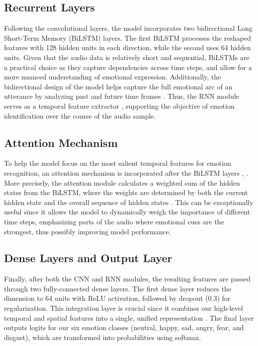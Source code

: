 \documentclass[../main.tex]{subfiles}
\begin{document}
\subsection{Recurrent Layers}
Following the convolutional layers, the model incorporates two bidirectional
Long Short-Term Memory (BiLSTM) layers. The first BiLSTM processes the reshaped features 
with 128 hidden units in each direction, while the second uses 64 hidden units. Given that 
the audio data is relatively short and sequential, BiLSTMs are a practical choice as they capture
dependencies across time steps, and allow for a more nuanced understanding of
emotional expression. Additionally, the bidirectional design of the model helps
capture the full emotional arc of an utterance by analyzing past and future time
frames \citep{Orhan2021}. Thus, the RNN module serves as a temporal feature extractor \citep{Chen2018}, supporting
the objective of emotion identification over the course of the audio sample.

\subsection{Attention Mechanism}
To help the model focus on the most salient temporal features for emotion
recognition, an attention mechanism is incorporated after the BiLSTM layers \citep{Peng2020}, \citep{Chen2018}.
More precisely, the attention module calculates a weighted sum of the hidden
states from the BiLSTM, where the weights are determined by both the current hidden
state and the overall sequence of hidden states \citep{Chen2018}. This can be exceptionally
useful since it allows the model to dynamically weigh the importance of
different time steps, emphasizing parts of the audio where emotional cues are
the strongest, thus possibly improving model performance.

\subsection{Dense Layers and Output Layer}
Finally, after both the CNN and RNN modules, the resulting features are passed
through two fully-connected dense layers. The first dense layer reduces the dimension to 
64 units with ReLU activation, followed by dropout (0.3) for regularization. This integration 
layer is crucial since it combines our high-level temporal and spatial features into a single, unified
representation \citep{Chen2018}. The final layer outputs logits for our six emotion classes 
(neutral, happy, sad, angry, fear, and disgust), which are transformed into probabilities using softmax.
\end{document}
